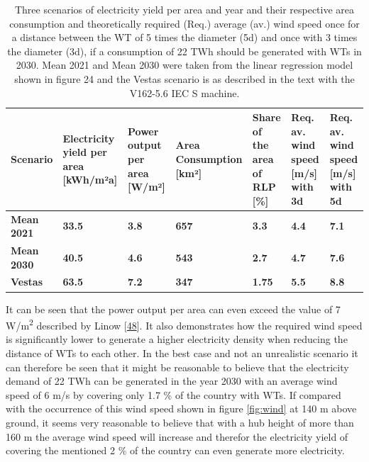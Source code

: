 \documentclass[a4paper,11pt]{article}
\begin{document}
\begin{table}[H]

\caption{\label{tab:table2}Three scenarios of electricity yield per area and year and their respective area consumption 
  and theoretically required (Req.) average (av.) wind speed once for a distance between the WT of 5 times 
  the diameter (5d)  and once with 3 times the diameter (3d), if a consumption of 22 TWh should be generated 
  with WTs in 2030. Mean 2021 and Mean 2030 were taken from the linear regression model shown in figure 24 
  and the Vestas scenario is as described in the text with the V162-5.6 IEC S machine.}
\centering
\begin{tabular}[t]{>{\raggedright\arraybackslash}p{1.8cm}>{\raggedright\arraybackslash}p{1.8cm}>{\raggedright\arraybackslash}p{1.8cm}>{\raggedright\arraybackslash}p{1.8cm}>{\raggedright\arraybackslash}p{1.8cm}>{\raggedright\arraybackslash}p{1.8cm}>{\raggedright\arraybackslash}p{1.8cm}}
\toprule
Scenario & Electricity yield per area [kWh/m²a] & Power output per area [W/m²] & Area Consumption [km²] & Share of the area of RLP [\%] & Req. av. wind speed [m/s] with 3d & Req. av. wind speed [m/s] with 5d\\
\midrule
\textbf{Mean 2021} & \textbf{33.5} & \textbf{3.8} & \textbf{657} & \textbf{3.3} & \textbf{4.4} & \textbf{7.1}\\
\midrule
\textbf{Mean 2030} & \textbf{40.5} & \textbf{4.6} & \textbf{543} & \textbf{2.7} & \textbf{4.7} & \textbf{7.6}\\
\midrule
\textbf{Vestas} & \textbf{63.5} & \textbf{7.2} & \textbf{347} & \textbf{1.75} & \textbf{5.5} & \textbf{8.8}\\
\midrule
\bottomrule
\end{tabular}
\end{table}
It can be seen that the power output per area can even exceed the value of 7 W/m\textsuperscript{2} described by Linow {[}\protect\hyperlink{ref-SvenLinow.2020}{48}{]}. It also demonstrates how the required wind speed is significantly lower to generate a higher electricity density when reducing the distance of WTs to each other. In the best case and not an unrealistic scenario it can therefore be seen that it might be reasonable to believe that the electricity demand of 22 TWh can be generated in the year 2030 with an average wind speed of 6 m/s by covering only 1.7 \% of the country with WTs. If compared with the occurrence of this wind speed shown in figure \ref{fig:wind} at 140 m above ground, it seems very reasonable to believe that with a hub height of more than 160 m the average wind speed will increase and therefor the electricity yield of covering the mentioned 2 \% of the country can even generate more electricity.
\end{document}
